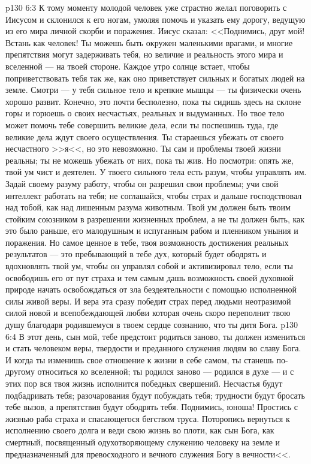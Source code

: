\vs p130 6:3 К тому моменту молодой человек уже страстно желал поговорить с Иисусом и склонился к его ногам, умоляя помочь и указать ему дорогу, ведущую из его мира личной скорби и поражения. Иисус сказал: <<Поднимись, друг мой! Встань как человек! Ты можешь быть окружен маленькими врагами, и многие препятствия могут задерживать тебя, но величие и реальность этого мира и вселенной --- на твоей стороне. Каждое утро солнце встает, чтобы поприветствовать тебя так же, как оно приветствует сильных и богатых людей на земле. Смотри --- у тебя сильное тело и крепкие мышцы --- ты физически очень хорошо развит. Конечно, это почти бесполезно, пока ты сидишь здесь на склоне горы и горюешь о своих несчастьях, реальных и выдуманных. Но твое тело может помочь тебе совершить великие дела, если ты поспешишь туда, где великие дела ждут своего осуществления. Ты стараешься убежать от своего несчастного >>я<<, но это невозможно. Ты сам и проблемы твоей жизни реальны; ты не можешь убежать от них, пока ты жив. Но посмотри: опять же, твой ум чист и деятелен. У твоего сильного тела есть разум, чтобы управлять им. Задай своему разуму работу, чтобы он разрешил свои проблемы; учи свой интеллект работать на тебя; не соглашайся, чтобы страх и дальше господствовал над тобой, как над лишенным разума животным. Твой ум должен быть твоим стойким союзником в разрешении жизненных проблем, а не ты должен быть, как это было раньше, его малодушным и испуганным рабом и пленником уныния и поражения. Но самое ценное в тебе, твоя возможность достижения реальных результатов --- это пребывающий в тебе дух, который будет ободрять и вдохновлять твой ум, чтобы он управлял собой и активизировал тело, если ты освободишь его от пут страха и тем самым дашь возможность своей духовной природе начать освобождаться от зла бездеятельности с помощью исполненной силы живой веры. И вера эта сразу победит страх перед людьми неотразимой силой новой и всепобеждающей любви  которая очень скоро переполнит твою душу благодаря родившемуся в твоем сердце сознанию, что ты дитя Бога.
\vs p130 6:4 В этот день, сын мой, тебе предстоит родиться заново, ты должен измениться и стать человеком веры, твердости и преданного служения людям во славу Бога. И когда ты изменишь свое отношение к жизни в себе самом, ты станешь по\hyp{}другому относиться ко вселенной; ты родился заново --- родился в духе --- и с этих пор вся твоя жизнь исполнится победных свершений. Несчастья будут подбадривать тебя; разочарования будут побуждать тебя; трудности будут бросать тебе вызов, а препятствия будут ободрять тебя. Поднимись, юноша! Простись с жизнью раба страха и спасающегося бегством труса. Поторопись вернуться к исполнению своего долга и веди свою жизнь во плоти, как сын Бога, как смертный, посвященный одухотворяющему служению человеку на земле и предназначенный для превосходного и вечного служения Богу в вечности<<.
